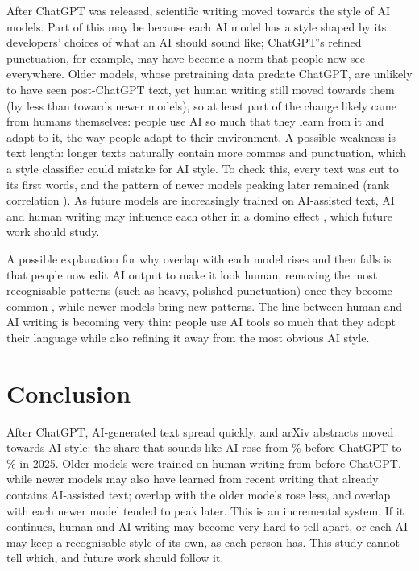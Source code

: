 \documentclass[11pt]{article}
\begin{document}
After ChatGPT was released, scientific writing moved towards the style of AI models. Part of this may be because
each AI model has a style shaped by its developers' choices of what an AI should sound like; ChatGPT's refined
punctuation, for example, may have become a norm that people now see everywhere. Older models, whose pretraining
data predate ChatGPT, are unlikely to have seen post-ChatGPT text, yet human writing still moved towards them (by
less than towards newer models), so at least part of the change likely came from humans themselves: people use AI
so much that they learn from it and adapt to it, the way people adapt to their environment. A possible weakness is
text length: longer texts naturally contain more commas and punctuation, which a style classifier could mistake for
AI style. To check this, every text was cut to its first  words, and the pattern of newer
models peaking later remained (rank correlation ). As future models are increasingly trained
on AI-assisted text, AI and human writing may influence each other in a domino effect \citep{shumailov2024,
gerstgrasser2024}, which future work should study.

A possible explanation for why overlap with each model rises and then falls is that people now edit AI output to
make it look human, removing the most recognisable patterns (such as heavy, polished punctuation) once they become
common \citep[as with publicised marker words;][]{geng2025}, while newer models bring new patterns. The line between
human and AI writing is becoming very thin: people use AI tools so much that they adopt their language while also
refining it away from the most obvious AI style.

\section{Conclusion}
After ChatGPT, AI-generated text spread quickly, and arXiv abstracts moved towards AI style: the share that sounds
like AI rose from \% before ChatGPT to \% in 2025. Older
models were trained on human writing from before ChatGPT, while newer models may also have learned from recent
writing that already contains AI-assisted text; overlap with the older models rose less, and overlap with each
newer model tended to peak later. This is an incremental system. If it continues, human and AI writing may become
very hard to tell apart, or each AI may keep a recognisable style of its own, as each person has. This study cannot
tell which, and future work should follow it.
\end{document}
